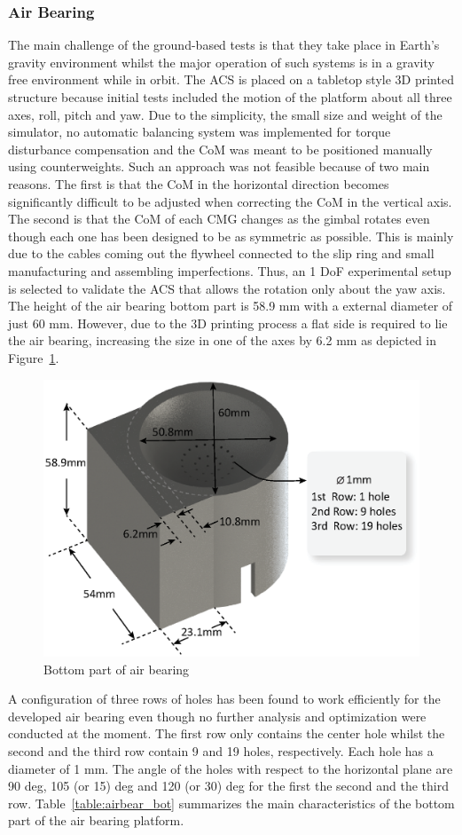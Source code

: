 \documentclass[aerospace,article,submit,moreauthors,dvi2pdf]{Definitions/mdpi}
\begin{document}
\subsubsection{Air Bearing}

The main challenge of the ground-based tests is that they take place in Earth's gravity environment whilst the major operation of such systems is in a gravity free environment while in orbit. The ACS is placed on a tabletop style 3D printed structure because initial tests included the motion of the platform about all three axes, roll, pitch and yaw. Due to the simplicity, the small size and weight of the simulator, no automatic balancing system was implemented for torque disturbance compensation and the CoM was meant to be positioned manually using counterweights. Such an approach was not feasible because of two main reasons. The first is that the CoM in the horizontal direction becomes significantly difficult to be adjusted when correcting the CoM in the vertical axis. The second is that the CoM of each CMG changes as the gimbal rotates even though each one has been designed to be as symmetric as possible. This is mainly due to the cables coming out the flywheel connected to the slip ring and small manufacturing and assembling imperfections. Thus, an 1 DoF experimental setup is selected to validate the ACS that allows the rotation only about the yaw axis. The height of the air bearing bottom part is 58.9 mm with a external diameter of just 60 mm. However, due to the 3D printing process a flat side is required to lie the air bearing, increasing the size in one of the axes by 6.2 mm as depicted in Figure~\ref{fig:bot}.
\begin{figure}[H]
\includegraphics[width=12cm]{airbotdimensions.eps}
\caption{Bottom part of air bearing \label{fig:bot}}
\end{figure}
A configuration of three rows of holes has been found to work efficiently for the developed air bearing even though no further analysis and optimization were conducted at the moment. The first row only contains the center hole whilst the second and the third row contain 9 and 19 holes, respectively. Each hole has a diameter of 1 mm. The angle of the holes with respect to the  horizontal plane are 90 deg, 105 (or 15) deg and 120 (or 30) deg for the first the second and the third row. Table~\ref{table:airbear_bot} summarizes the main characteristics of the bottom part of the air bearing platform.
\end{document}
